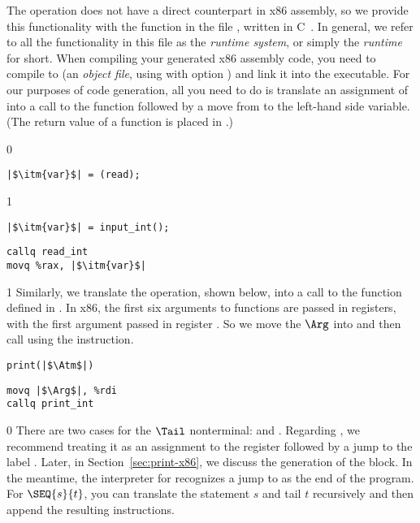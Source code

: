 \documentclass[7x10]{TimesAPriori_MIT}%
\def\racketEd{0}
\def\pythonEd{1}
\def\edition{1}
\newcommand{\pythonColor}[0]{}
\numberwithin{theorem}{chapter}
\numberwithin{definition}{chapter}
\numberwithin{equation}{chapter}
\begin{document}
The \READOP{} operation does not have a direct counterpart in x86
assembly, so we provide this functionality with the function
 in the file , written in
C~\citep{Kernighan:1988nx}. In general, we refer to all the
functionality in this file as the \emph{runtime system}, or simply the \emph{runtime} for short. When compiling your
generated x86 assembly code, you need to compile  to
 (an \emph{object file}, using  with option
) and link it into the executable. For our purposes of code
generation, all you need to do is translate an assignment of
\READOP{} into a call to the  function followed by a
move from  to the left-hand side variable.  (The
return value of a function is placed in .)  
\begin{transformation}
{\if\edition\racketEd  
\begin{lstlisting}
|$\itm{var}$| = (read);
\end{lstlisting}
\fi}
{\if\edition\pythonEd\pythonColor
\begin{lstlisting}
|$\itm{var}$| = input_int();
\end{lstlisting}
\fi}
\compilesto
\begin{lstlisting}
callq read_int
movq %rax, |$\itm{var}$|
\end{lstlisting}
\end{transformation}

{\if\edition\pythonEd\pythonColor
%
Similarly, we translate the  operation, shown below, into
a call to the  function defined in .
In x86, the first six arguments to functions are passed in registers,
with the first argument passed in register . So we move the
$\Arg$ into  and then call  using the
 instruction.
\begin{transformation}
\begin{lstlisting}
print(|$\Atm$|)    
\end{lstlisting}
\compilesto
\begin{lstlisting}
movq |$\Arg$|, %rdi
callq print_int  
\end{lstlisting}
\end{transformation}
%
\fi}  

{\if\edition\racketEd
%
There are two cases for the $\Tail$ nonterminal:  and
. Regarding , we recommend treating it as an
assignment to the  register followed by a jump to
the label . Later, in Section~\ref{sec:print-x86},
we discuss the generation of the  block.
In the meantime, the interpreter for \LangXVar{} recognizes a jump
to  as the end of the program.
For $\SEQ{s}{t}$, you can translate the statement $s$ and tail $t$
recursively and then append the resulting instructions.
%
\fi}
\end{document}
